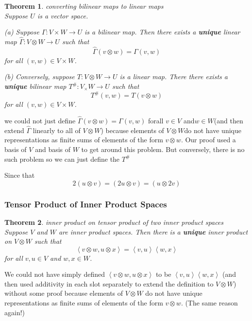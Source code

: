\documentclass{article}
\newtheorem{theorem}{Theorem}[subsection]
\begin{document}
\begin{CJK}{UTF8}{gkai}
\begin{theorem}
    converting bilinear maps to linear maps\\

    Suppose $U$ is a vector space.

    (a) Suppose $\Gamma: V\times W \to U$ is a bilinear map. Then there exists a \textbf{unique} linear map $\hat{\Gamma}: V\otimes W \to U$ such that
    \[\hat{\Gamma}(v \otimes w) = \Gamma(v,w)\]
    for all $(v,w) \in V\times W$.

    (b) Conversely, suppose $T: V \otimes W \to U$ is a linear map. There there exists a \textbf{unique} bilinear map $T^{\#}: V_\times W \to U$ such that
    \[T^{\#}(v,w) = T(v\otimes w)\]
    for all $(v,w) \in V\times W$.
\end{theorem}

    we could not just define $\hat{\Gamma}(v\otimes w) = \Gamma(v,w)$ forall $v\in V$ and$w \in W$(and then extend $\hat{\Gamma}$ linearly to all of $V\otimes W$) because elements of $V \otimes  W$do not have unique representations as finite sums of elements of the form $v\otimes w$. Our proof used a basis of $V$ and basis of $W$ to get around this problem. But conversely, there is no such problem so we can just define the $T^{\#}$

Since that 
\[2 (u \otimes v) =  (2 u \otimes v) = (u \otimes 2v)\]

\subsubsection{Tensor Product of Inner Product Spaces}

\begin{theorem}
    inner product on tensor product of two inner product spaces\\

    Suppose $V$ and $W$ are inner product spaces. Then there is a \textbf{unique} inner product on $V \otimes W$ such that
    \[\left<v \otimes w,u\otimes x\right>=\left<v,u\right>\left<w,x\right>\]
    for all $v,u\in V$ and $w,x\in W$.
\end{theorem}

    We could not have simply defined $\left<v\otimes w,u\otimes x\right>$ to be $\left<v,u\right>\left<w,x\right>$ (and then used additivity in each slot separately to extend the definition to $V\otimes W$) without some proof because elements of $V \otimes W$ do not have unique representations as finite sums of elements of the form $v \otimes w$. (The same reason again!)


\end{CJK}
\end{document}
